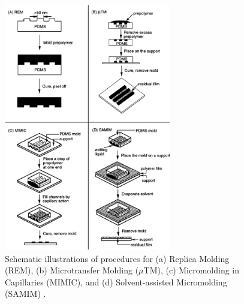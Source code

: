 \begin{figure}[h]%
\centering
\includegraphics[width=0.65\textwidth]{figures/literaturereview/figure2_7}%
\caption{Schematic illustrations of procedures for (a) Replica Molding (REM), (b) Microtransfer Molding ($\mu$TM), (c) Micromolding in Capillaries (MIMIC), and (d) Solvent-assisted Micromolding (SAMIM) \cite{xia1998soft}.}%
\label{figure2_7}%
\end{figure}

